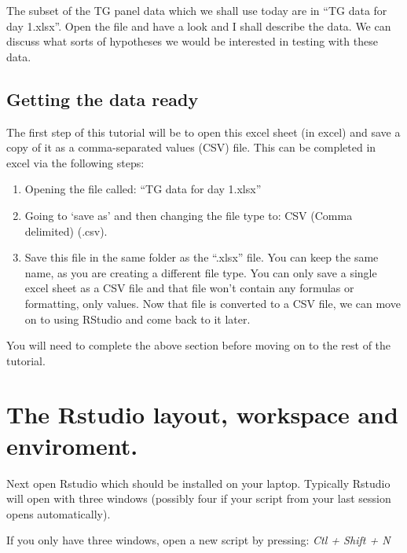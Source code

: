 \documentclass[
]{book}
\makeatletter
\newenvironment{kframe}{%
\medskip{}
\setlength{\fboxsep}{.8em}
 \def\at@end@of@kframe{}%
 \ifinner\ifhmode%
  \def\at@end@of@kframe{\end{minipage}}%
  \begin{minipage}{\columnwidth}%
 \fi\fi%
 \def\FrameCommand##1{\hskip\@totalleftmargin \hskip-\fboxsep
 \colorbox{shadecolor}{##1}\hskip-\fboxsep
     \hskip-\linewidth \hskip-\@totalleftmargin \hskip\columnwidth}%
 \MakeFramed {\advance\hsize-\width
   \@totalleftmargin\z@ \linewidth\hsize
   \@setminipage}}%
 {\par\unskip\endMakeFramed%
 \at@end@of@kframe}
\newenvironment{rmdblock}[1]
  {
  \begin{itemize}
  \renewcommand{\labelitemi}{
    \raisebox{-.7\height}[0pt][0pt]{
      {\setkeys{Gin}{width=3em,keepaspectratio}\texttt{[image: images/\#1]}}
    }
  }
  \setlength{\fboxsep}{1em}
  \begin{kframe}
  \item
  }
  {
  \end{kframe}
  \end{itemize}
  }
\newenvironment{rmdcaution}
  {\begin{rmdblock}{caution}}
  {\end{rmdblock}}
\makeatother
\begin{document}
The subset of the TG panel data which we shall use today are in ``TG data for day 1.xlsx''. Open the file and have a look and I shall describe the data. We can discuss what sorts of hypotheses we would be interested in testing with these data.

\hypertarget{getting-the-data-ready}{%
\subsection{Getting the data ready}\label{getting-the-data-ready}}

The first step of this tutorial will be to open this excel sheet (in excel) and save a copy of it as a comma-separated values (CSV) file. This can be completed in excel via the following steps:

\begin{enumerate}
\def\labelenumi{\arabic{enumi}.}
\item
  Opening the file called: ``TG data for day 1.xlsx''
\item
  Going to `save as' and then changing the file type to: CSV (Comma delimited) (.csv).
\item
  Save this file in the same folder as the ``.xlsx'' file. You can keep the same name, as you are creating a different file type. You can only save a single excel sheet as a CSV file and that file won't contain any formulas or formatting, only values. Now that file is converted to a CSV file, we can move on to using RStudio and come back to it later.
\end{enumerate}

\begin{rmdcaution}
You will need to complete the above section before moving on to the rest of the tutorial.
\end{rmdcaution}

\hypertarget{the-rstudio-layout-workspace-and-enviroment.}{%
\section{The Rstudio layout, workspace and enviroment.}\label{the-rstudio-layout-workspace-and-enviroment.}}

Next open Rstudio which should be installed on your laptop. Typically Rstudio will open with three windows (possibly four if your script from your last session opens automatically).

If you only have three windows, open a new script by pressing: \emph{Ctl + Shift + N}
\end{document}
